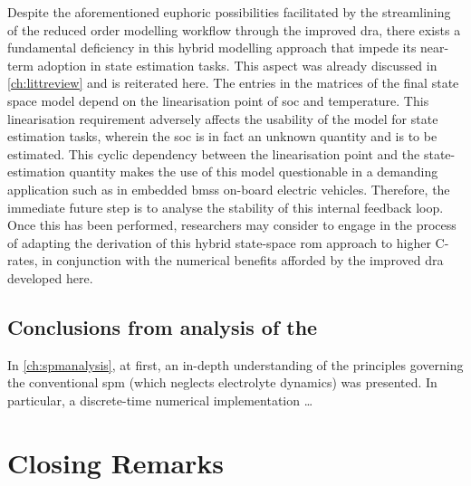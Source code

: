 Despite   the  aforementioned   euphoric   possibilities   facilitated  by   the
streamlining  of  the reduced  order  modelling  workflow through  the  improved
\gls{dra},  there  exists a  fundamental  deficiency  in this  hybrid  modelling
approach  that impede  its near-term  adoption in  state estimation  tasks. This
aspect was already discussed in \cref{ch:littreview} and is reiterated here. The
entries  in  the  matrices  of  the  final  state  space  model  depend  on  the
linearisation point of \gls{soc} and temperature. This linearisation requirement
adversely affects the usability of the model for state estimation tasks, wherein
the \gls{soc} is in fact an unknown quantity and is to be estimated. This cyclic
dependency  between the  linearisation point  and the  state-estimation quantity
makes the use of  this model questionable in a demanding  application such as in
embedded \glspl{bms} on-board electric vehicles. Therefore, the immediate future
step is to analyse  the stability of this internal feedback  loop. Once this has
been performed,  researchers may consider to  engage in the process  of adapting
the derivation of this hybrid  state-space \gls{rom} approach to higher C-rates,
in conjunction  with the numerical  benefits afforded by the  improved \gls{dra}
developed here.


\subsection{Conclusions from analysis of the }

In \cref{ch:spmanalysis}, at first, an  in-depth understanding of the principles
governing the  conventional \gls{spm} (which neglects  electrolyte dynamics) was
presented. In particular, a discrete-time numerical implementation \dots

\section{Closing Remarks}







